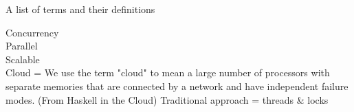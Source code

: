 \makeatletter {}\makeatother
{}

A list of terms and their definitions

Concurrency\\
Parallel\\
Scalable\\
Cloud = We use the term "cloud" to mean a large number of processors with separate memories that are connected by a network and have independent failure modes.  (From Haskell in the Cloud)
Traditional approach = threads & locks


\worksheetend